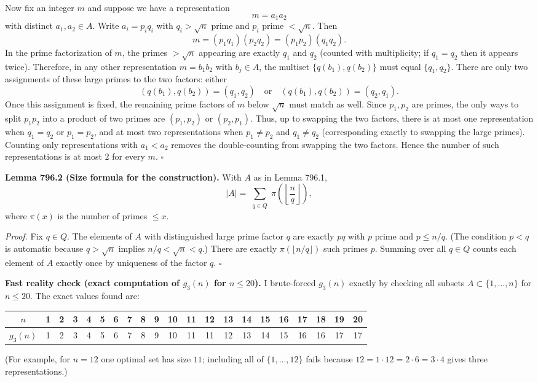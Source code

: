 Now fix an integer $m$ and suppose we have a representation
\[
 m=a_1a_2
\]
with distinct $a_1,a_2\in A$.
Write $a_i=p_i q_i$ with $q_i>\sqrt n$ prime and $p_i$ prime $<\sqrt n$.
Then
\[
 m = (p_1q_1)(p_2q_2) = (p_1p_2)(q_1q_2).
\]
In the prime factorization of $m$, the primes $>\sqrt n$ appearing are exactly $q_1$ and $q_2$ (counted with multiplicity; if $q_1=q_2$ then it appears twice).
Therefore, in any other representation $m=b_1b_2$ with $b_j\in A$, the multiset $\{q(b_1),q(b_2)\}$ must equal $\{q_1,q_2\}$.
There are only two assignments of these large primes to the two factors: either
\[(q(b_1),q(b_2))=(q_1,q_2)\quad\text{or}\quad(q(b_1),q(b_2))=(q_2,q_1).
\]
Once this assignment is fixed, the remaining prime factors of $m$ below $\sqrt n$ must match as well. Since $p_1,p_2$ are primes, the only ways to split $p_1p_2$ into a product of two primes are $(p_1,p_2)$ or $(p_2,p_1)$.
Thus, up to swapping the two factors, there is at most one representation when $q_1=q_2$ or $p_1=p_2$, and at most two representations when $p_1\ne p_2$ and $q_1\ne q_2$ (corresponding exactly to swapping the large primes).
Counting only representations with $a_1<a_2$ removes the double-counting from swapping the two factors.
Hence the number of such representations is at most $2$ for every $m$.
\hfill$\square$

\medskip
\textbf{Lemma 796.2 (Size formula for the construction).}
With $A$ as in Lemma 796.1,
\[
|A| = \sum_{\substack{q\in Q}} \pi\!\left(\left\lfloor \frac{n}{q}\right\rfloor\right),
\]
where $\pi(x)$ is the number of primes $\le x$.

\emph{Proof.}
Fix $q\in Q$. The elements of $A$ with distinguished large prime factor $q$ are exactly $pq$ with $p$ prime and $p\le n/q$. (The condition $p<q$ is automatic because $q>\sqrt n$ implies $n/q<\sqrt n<q$.)
There are exactly $\pi(\lfloor n/q\rfloor)$ such primes $p$.
Summing over all $q\in Q$ counts each element of $A$ exactly once by uniqueness of the factor $q$.
\hfill$\square$

\medskip
\textbf{Fast reality check (exact computation of $g_3(n)$ for $n\le 20$).}
I brute-forced $g_3(n)$ exactly by checking all subsets $A\subset\{1,\dots,n\}$ for $n\le 20$.
The exact values found are:
\begin{center}
\begin{tabular}{c|cccccccccccccccccccc}
$n$&1&2&3&4&5&6&7&8&9&10&11&12&13&14&15&16&17&18&19&20\\\hline
$g_3(n)$&1&2&3&4&5&6&7&8&9&10&11&11&12&13&14&15&16&16&17&17
\end{tabular}
\end{center}
(For example, for $n=12$ one optimal set has size $11$; including all of $\{1,\dots,12\}$ fails because $12=1\cdot 12=2\cdot 6=3\cdot 4$ gives three representations.)

